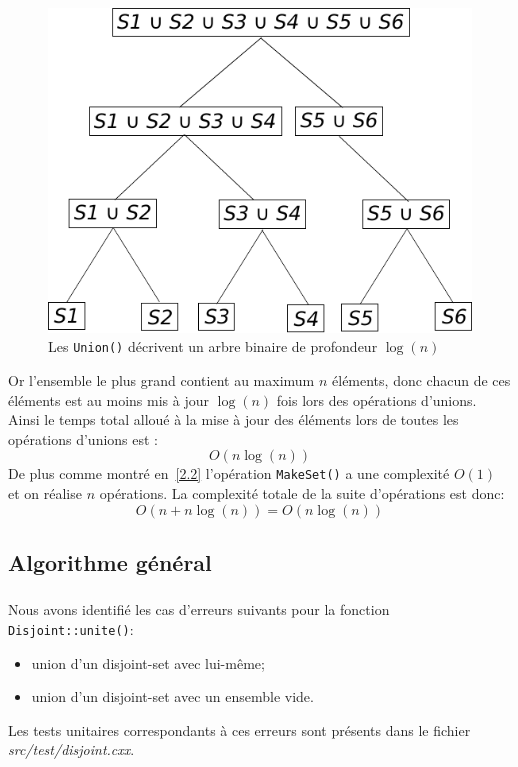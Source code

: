 \documentclass[10pt,a4paper]{article}
\begin{document}
{\begin{figure}
\centering
\includegraphics[scale=0.5]{3-5.pdf}
\caption{Les \texttt{Union()} décrivent un arbre binaire de profondeur $\log(n)$}
\label{fig:tree}
\end{figure}

Or l'ensemble le plus grand contient au maximum $n$ éléments, donc chacun de ces éléments est au moins mis à jour $\log(n)$ fois lors des opérations d'unions. Ainsi le temps total alloué à la mise à jour des éléments lors de toutes les opérations d'unions est : 
$$O(n\log(n))$$
De plus comme montré en~\ref{2.2} l'opération \texttt{MakeSet()} a une complexité $O(1)$ et on réalise $n$ opérations.
La complexité totale de la suite d'opérations est donc:
$$O(n+n\log(n)) = O(n\log(n))$$

\subsection{Algorithme général}
\subsubsection{}
Nous avons identifié les cas d'erreurs suivants pour la fonction \texttt{Disjoint::unite()}:
\begin{itemize}
\itemsep0em 
\item union d'un disjoint-set avec lui-même;
\item union d'un disjoint-set avec un ensemble vide.
\end{itemize}
Les tests unitaires correspondants à ces erreurs sont présents dans le fichier \textit{src/test/disjoint.cxx}.

}
\end{document}
